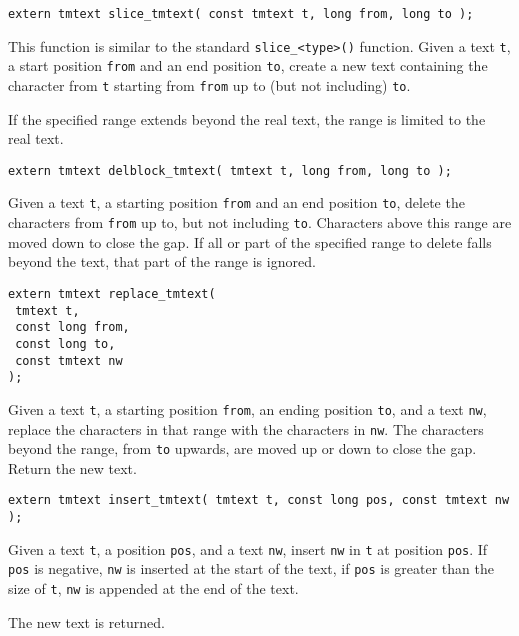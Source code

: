 \begin{verbatim}
extern tmtext slice_tmtext( const tmtext t, long from, long to );
\end{verbatim}
\begin{desc}
This function is similar to the standard \verb'slice_<type>()'
function.
Given a text \verb't', a start position \verb'from' and an end position
\verb'to', create a new text containing the character from \verb't'
starting from \verb'from' up to (but not including) \verb'to'.
\par
If the specified range extends beyond the real text, the range is
limited to the real text.
\end{desc}
\begin{verbatim}
extern tmtext delblock_tmtext( tmtext t, long from, long to );
\end{verbatim}
\begin{desc}
Given a text \verb't', a starting position \verb'from' and an end position
\verb'to', delete the characters from \verb'from' up to, but not including
\verb'to'.
Characters above this range are moved down to close the gap.
If all or part of the specified range to delete falls beyond the text,
that part of the range is ignored.
\end{desc}
\begin{verbatim}
extern tmtext replace_tmtext(
 tmtext t,
 const long from,
 const long to,
 const tmtext nw
);
\end{verbatim}
\begin{desc}
Given a text \verb't', a starting position \verb'from', an ending
position \verb'to', and a text \verb'nw', replace the characters in 
that range with the characters in \verb'nw'. The characters beyond the
range, from \verb'to' upwards, are moved up or down to close the gap.
Return the new text.
\end{desc}
\begin{verbatim}
extern tmtext insert_tmtext( tmtext t, const long pos, const tmtext nw );
\end{verbatim}
\begin{desc}
Given a text \verb't', a position \verb'pos', 
and a text \verb'nw', insert \verb'nw' in \verb't' at position \verb'pos'.
If \verb'pos' is negative, \verb'nw' is inserted at the start of the text,
if \verb'pos' is greater than the size of \verb't', \verb'nw' is appended
at the end of the text.
\par
The new text is returned.
\end{desc}
